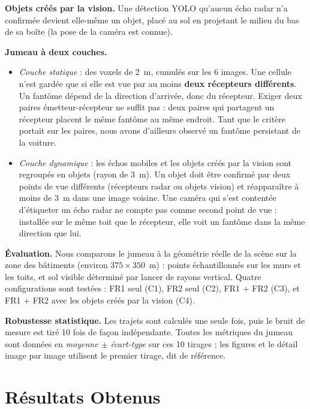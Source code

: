 \documentclass[12pt,a4paper,titlepage]{article}
\begin{document}
\textbf{Objets créés par la vision.} Une détection YOLO qu'aucun écho radar n'a confirmée devient elle-même un objet, placé au sol en projetant le milieu du bas de sa boîte (la pose de la caméra est connue).

\textbf{Jumeau à deux couches.}
\begin{itemize}[leftmargin=1.5em]
    \item \emph{Couche statique} : des voxels de 2~m, cumulés sur les 6 images. Une cellule n'est gardée que si elle est vue par au moins \textbf{deux récepteurs différents}. Un fantôme dépend de la direction d'arrivée, donc du récepteur. Exiger deux paires émetteur-récepteur ne suffit pas : deux paires qui partagent un récepteur placent le même fantôme au même endroit. Tant que le critère portait sur les paires, nous avons d'ailleurs observé un fantôme persistant de la voiture.
    \item \emph{Couche dynamique} : les échos mobiles et les objets créés par la vision sont regroupés en objets (rayon de 3~m). Un objet doit être confirmé par deux points de vue différents (récepteurs radar ou objets vision) et réapparaître à moins de 3~m dans une image voisine. Une caméra qui s'est contentée d'étiqueter un écho radar ne compte pas comme second point de vue : installée sur le même toit que le récepteur, elle voit un fantôme dans la même direction que lui.
\end{itemize}

\textbf{Évaluation.} Nous comparons le jumeau à la géométrie réelle de la scène sur la zone des bâtiments (environ $375\times350$~m) : points échantillonnés sur les murs et les toits, et sol visible déterminé par lancer de rayons vertical. Quatre configurations sont testées : FR1 seul (C1), FR2 seul (C2), FR1 + FR2 (C3), et FR1 + FR2 avec les objets créés par la vision (C4).

\textbf{Robustesse statistique.} Les trajets sont calculés une seule fois, puis le bruit de mesure est tiré 10 fois de façon indépendante. Toutes les métriques du jumeau sont données en \emph{moyenne $\pm$ écart-type} sur ces 10 tirages ; les figures et le détail image par image utilisent le premier tirage, dit de référence.


\section{Résultats Obtenus}
\label{sec:resultats}
\end{document}
